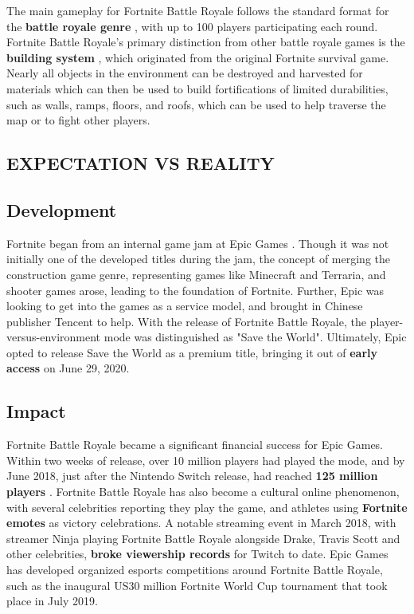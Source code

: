 \documentclass[a4paper,10pt]{book}
\begin{document}
          The main gameplay for Fortnite Battle Royale follows the standard format for the  \textbf{battle royale genre } , with up to 100 players participating each round.
          Fortnite Battle Royale's primary distinction from other battle royale games is the  \textbf{building system } , which originated from the original Fortnite survival game.
          Nearly all objects in the environment can be destroyed and harvested for materials which can then be used to build fortifications of limited durabilities, such as walls, ramps, floors, and roofs,
          which can be used to help traverse the map or to fight other  players.
         
 
 
 \subsection{EXPECTATION VS REALITY }
 
 
 
 
 
 
 \subsection{Development }
 
          Fortnite began from an internal game jam at Epic Games . Though it was not initially one of the developed titles during the jam, the concept of merging the construction game genre, representing games
          like Minecraft and Terraria, and shooter games arose, leading to the foundation of Fortnite. Further, Epic was looking to get into the games as a service model, and brought in Chinese publisher
          Tencent to help. With the release of Fortnite Battle Royale, the player-versus-environment mode was distinguished as "Save the World". Ultimately, Epic opted to release Save the World as a premium title,
          bringing it out of  \textbf{early access }  on June 29, 2020.
         
 
 \subsection{Impact }
 
 
          Fortnite Battle Royale became a significant financial success for Epic Games. Within two weeks of release, over 10 million players had played the mode, and by June 2018, just after the Nintendo Switch
          release, had reached  \textbf{125 million players } . Fortnite Battle Royale has also become a cultural online phenomenon, with several celebrities reporting they play the game, and athletes using  \textbf{Fortnite emotes } 
          as victory celebrations. A notable streaming event in March 2018, with streamer Ninja playing Fortnite Battle Royale alongside Drake, Travis Scott and other celebrities,  \textbf{broke viewership records }  for Twitch
          to date. Epic Games has developed organized esports competitions around Fortnite Battle Royale, such as the inaugural US30 million Fortnite World Cup tournament that took place in July 2019.
         
\end{document}
